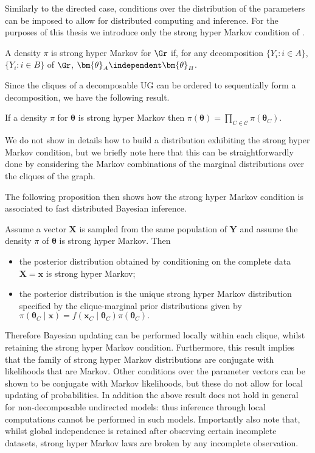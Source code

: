 Similarly to the directed case, conditions over the distribution of the parameters can be imposed to allow for distributed computing and inference. For the purposes of this thesis we introduce only the strong hyper Markov condition of \citet{Dawid1993}.
\begin{definition}
\label{def:strongMarkov}
A density $\pi$ is strong hyper Markov for $\Gr$ if, for any decomposition $\{Y_i:i\in A\}$, $\{Y_i:i\in B\}$ of $\Gr$, $\bm{\theta}_A\independent \bm{\theta}_B$.
\end{definition} 
Since the cliques of a decomposable \gls{UG} can be ordered to sequentially form a decomposition, we have the following result.
\begin{lemma}
\label{lemma:strongMarkov}
If a density $\pi$ for $\bm{\theta}$ is strong hyper Markov  then 
$
\pi(\bm{\theta})=\prod_{C\in\mathcal{C}}\pi(\bm{\theta}_{C}).$
\end{lemma}
We do not show in details how to build a distribution exhibiting the strong hyper Markov condition, but we briefly note here that this can be straightforwardly done by considering the Markov combinations \citep{Massa2010} of the marginal distributions over the cliques of the graph. 

The following proposition then shows how the strong hyper Markov condition is associated to fast distributed Bayesian inference.
\begin{proposition}
\label{prop:markovupdating}
Assume a vector $\bm{X}$ is sampled from the same population of $\bm{Y}$ and assume the density $\pi$ of $\bm{\theta}$ is strong hyper Markov. Then
\begin{itemize}
\item the posterior distribution obtained by conditioning on the complete data $\bm{X}=\bm{x}$ is strong hyper Markov;
\item the posterior distribution is the unique strong hyper Markov distribution specified by the clique-marginal prior distributions given by $
\pi(\bm{\theta}_C\;|\; \bm{x})=f(\bm{x}_C\;|\;\bm{\theta}_C)\pi(\bm{\theta}_C).$
\end{itemize}
\end{proposition}
Therefore Bayesian updating can be performed locally within each clique, whilst retaining the strong hyper Markov condition. Furthermore, this result implies that the family of strong hyper Markov distributions are conjugate with likelihoods that are Markov. Other conditions over the parameter vectors can be shown to be conjugate with Markov likelihoods, but these do not allow for local updating of probabilities. In addition the above result does not hold in general for non-decomposable undirected models: thus inference through local computations cannot be performed in such models. Importantly also note that, whilst global independence is retained after observing certain incomplete datasets, strong hyper Markov laws are broken by any incomplete observation. 

